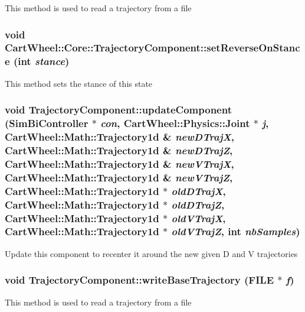 \label{classCartWheel_1_1Core_1_1TrajectoryComponent_ae6df1efc43d8cb573b3dfa0493e491cf}
This method is used to read a trajectory from a file \hypertarget{classCartWheel_1_1Core_1_1TrajectoryComponent_a18c1726753bacdef000f0e6e7c181f0a}{
\subsubsection[{setReverseOnStance}]{\setlength{\rightskip}{0pt plus 5cm}void CartWheel::Core::TrajectoryComponent::setReverseOnStance (int {\em stance})}}
\label{classCartWheel_1_1Core_1_1TrajectoryComponent_a18c1726753bacdef000f0e6e7c181f0a}
This method sets the stance of this state \hypertarget{classCartWheel_1_1Core_1_1TrajectoryComponent_a3771a3d28d488a93d44f3bc71c1162b9}{
\subsubsection[{updateComponent}]{\setlength{\rightskip}{0pt plus 5cm}void TrajectoryComponent::updateComponent ({\bf SimBiController} $\ast$ {\em con}, \/  {\bf CartWheel::Physics::Joint} $\ast$ {\em j}, \/  {\bf CartWheel::Math::Trajectory1d} \& {\em newDTrajX}, \/  {\bf CartWheel::Math::Trajectory1d} \& {\em newDTrajZ}, \/  {\bf CartWheel::Math::Trajectory1d} \& {\em newVTrajX}, \/  {\bf CartWheel::Math::Trajectory1d} \& {\em newVTrajZ}, \/  {\bf CartWheel::Math::Trajectory1d} $\ast$ {\em oldDTrajX}, \/  {\bf CartWheel::Math::Trajectory1d} $\ast$ {\em oldDTrajZ}, \/  {\bf CartWheel::Math::Trajectory1d} $\ast$ {\em oldVTrajX}, \/  {\bf CartWheel::Math::Trajectory1d} $\ast$ {\em oldVTrajZ}, \/  int {\em nbSamples})}}
\label{classCartWheel_1_1Core_1_1TrajectoryComponent_a3771a3d28d488a93d44f3bc71c1162b9}
Update this component to recenter it around the new given D and V trajectories \hypertarget{classCartWheel_1_1Core_1_1TrajectoryComponent_aeb954304d3c81830f2b543b159e889d7}{
\subsubsection[{writeBaseTrajectory}]{\setlength{\rightskip}{0pt plus 5cm}void TrajectoryComponent::writeBaseTrajectory (FILE $\ast$ {\em f})}}
\label{classCartWheel_1_1Core_1_1TrajectoryComponent_aeb954304d3c81830f2b543b159e889d7}
This method is used to read a trajectory from a file

